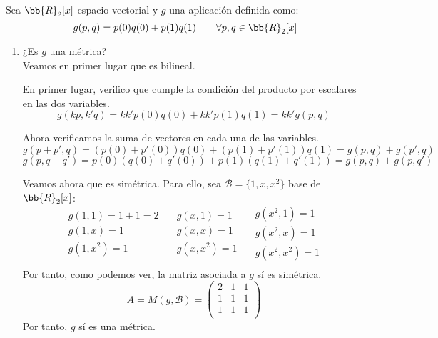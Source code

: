 \begin{ejercicio}
    Sea $\bb{R}_2[x]$ espacio vectorial y $g$ una aplicación definida como:
    $$g(p,q) = p(0)q(0) + p(1)q(1) \qquad \forall p,q \in \bb{R}_2[x]$$

    \begin{enumerate}
        \item \underline{¿Es $g$ una métrica?}\\
        Veamos en primer lugar que es bilineal.

        En primer lugar, verifico que cumple la condición del producto por escalares en las dos variables.
        $$g(kp, k'q) = kk'p(0)q(0) + kk'p(1)q(1) = kk' g(p,q)$$

        Ahora verificamos la suma de vectores en cada una de las variables.
        $$g(p+p', q) = (p(0)+p'(0))q(0) + (p(1) + p'(1))q(1) = g(p,q) + g(p', q)$$
        $$g(p,q+q') = p(0)(q(0)+q'(0)) + p(1)(q(1)+q'(1)) = g(p,q) + g(p, q')$$

        Veamos ahora que es simétrica. Para ello, sea $\mathcal{B}=\{1,x,x^2\}$ base de $\bb{R}_2[x]$:
        \begin{equation*}
            \begin{array}{l}
                g(1,1)=1+1=2 \\
                g(1,x)=1 \\
                g(1,x^2)= 1\\
            \end{array}
            \quad
            \begin{array}{l}
                g(x,1)=1 \\
                g(x,x)=1 \\
                g(x,x^2)= 1\\
            \end{array}
            \quad
            \begin{array}{l}
                g(x^2,1)=1 \\
                g(x^2,x)=1 \\
                g(x^2,x^2)= 1\\
            \end{array}
        \end{equation*}
        Por tanto, como podemos ver, la matriz asociada a $g$ sí es simétrica.
        \begin{equation*}
            A = M(g, \mathcal{B}) = \left( \begin{array}{ccc}
                2 & 1 & 1 \\
                1 & 1 & 1 \\
                1 & 1 & 1 \\
            \end{array}\right)
        \end{equation*}
        Por tanto, $g$ sí es una métrica.


\end{enumerate}
\end{ejercicio}
